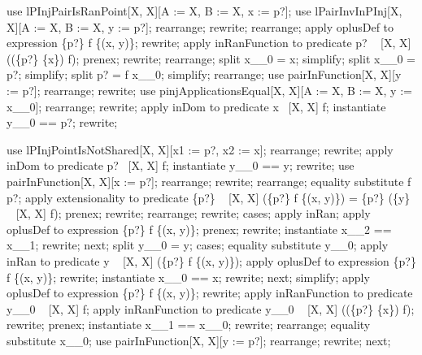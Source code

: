 \begin{LPScript}\begin{forget}[lHomogeneousPInjMidPointExtractNotInRan]
use lPInjPairIsRanPoint[X, X][A := X, B := X, x := p?];
use lPairInvInPInj[X, X][A := X, B := X, y := p?];
rearrange;
rewrite;
rearrange;
apply oplusDef to expression \{p?\} \ndres [X, X] f \oplus [X, X] \{(x, y)\};
rewrite;
apply inRanFunction to predicate p? \in  \ran~ [X, X] ((\{p?\} \cup [X] \{x\}) \ndres [X, X] f);
prenex;
rewrite;
rearrange;
split \lnot  x\_\_0 = x;
simplify;
split \lnot  x\_\_0 = p?;
simplify;
split p? = f x\_\_0;
simplify;
rearrange;
use pairInFunction[X, X][y := p?];
rearrange;
rewrite;
use pinjApplicationsEqual[X, X][A := X, B := X, y := x\_\_0];
rearrange;
rewrite;
apply inDom to predicate x \in  \dom~[X, X] f;
instantiate y\_\_0 == p?;
rewrite;
\end{forget}\end{LPScript}

\begin{LPScript}\begin{forget}[lHomogeneousMidPointExtractRanEquiv]
use lPInjPointIsNotShared[X, X][x1 := p?, x2 := x];
rearrange;
rewrite;
apply inDom to predicate p? \in  \dom~[X, X] f;
instantiate y\_\_0 == y;
rewrite;
use pairInFunction[X, X][x := p?];
rearrange;
rewrite;
rearrange;
equality substitute f p?;
apply extensionality to predicate \{p?\} \cup [X] \ran~ [X, X] (\{p?\} \ndres [X, X] f \oplus [X, X] \{(x, y)\}) = \{p?\} \cup [X] (\{y\} \cup [X] \ran~ [X, X] f);
prenex;
rewrite;
rearrange;
rewrite;
cases;
apply inRan;
apply oplusDef to expression \{p?\} \ndres [X, X] f \oplus [X, X] \{(x, y)\};
prenex;
rewrite;
instantiate x\_\_2 == x\_\_1;
rewrite;
next;
split y\_\_0 = y;
cases;
equality substitute y\_\_0;
apply inRan to predicate y \in  \ran~ [X, X] (\{p?\} \ndres [X, X] f \oplus [X, X] \{(x, y)\});
apply oplusDef to expression \{p?\} \ndres [X, X] f \oplus [X, X] \{(x, y)\};
rewrite;
instantiate x\_\_0 == x;
rewrite;
next;
simplify;
apply oplusDef to expression \{p?\} \ndres [X, X] f \oplus [X, X] \{(x, y)\};
rewrite;
apply inRanFunction to predicate y\_\_0 \in  \ran~ [X, X] f;
apply inRanFunction to predicate y\_\_0 \in  \ran~ [X, X] ((\{p?\} \cup [X] \{x\}) \ndres [X, X] f);
rewrite;
prenex;
instantiate x\_\_1 == x\_\_0;
rewrite;
rearrange;
equality substitute x\_\_0;
use pairInFunction[X, X][y := p?];
rearrange;
rewrite;
next;
\end{forget}\end{LPScript}

